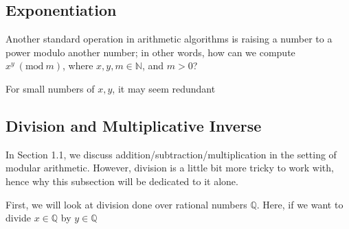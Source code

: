\documentclass[openany]{book}
\newcommand{\Mod}[1]{\ (\mathrm{mod}\ #1)}
\begin{document}
\subsection{Exponentiation}
Another standard operation in arithmetic algorithms is raising a number to a power modulo another number; in other words, how can we compute $x^y\Mod{m}$, where $x,y,m\in\mathbb{N}$, and $m>0$?

For small numbers of $x,y$, it may seem redundant

\subsection{Division and Multiplicative Inverse}
In Section 1.1, we discuss addition/subtraction/multiplication in  the setting of modular arithmetic. However, division is a little bit more tricky to work with, hence why this subsection will be dedicated to it alone.

First, we will look at division done over rational numbers $\mathbb{Q}$. Here, if we want to divide $x\in\mathbb{Q}$ by $y\in\mathbb{Q}$
\end{document}
